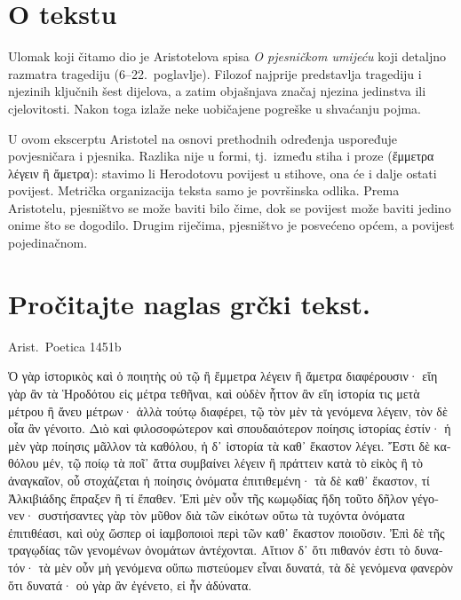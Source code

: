 


\section*{O tekstu}

Ulomak koji čitamo dio je Aristotelova spisa \textit{O pjesničkom umijeću} koji detaljno razmatra tragediju (6–22.\ poglavlje). Filozof najprije predstavlja tragediju i njezinih ključnih šest dijelova, a zatim objašnjava značaj njezina jedinstva ili cjelovitosti. Nakon toga izlaže neke uobičajene pogreške u shvaćanju pojma.
 
U ovom ekscerptu Aristotel na osnovi prethodnih određenja uspoređuje povjesničara i pjesnika. Razlika nije u formi, tj.\ između stiha i proze \textgreek[variant=ancient]{(ἔμμετρα λέγειν ἢ ἄμετρα):} stavimo li Herodotovu povijest u stihove, ona će i dalje ostati povijest. Metrička organizacija teksta samo je površinska odlika. Prema Aristotelu, pjesništvo se može baviti bilo čime, dok se povijest može baviti jedino onime što se dogodilo. Drugim riječima, pjesništvo je posvećeno općem, a povijest pojedinačnom.


\section*{Pročitajte naglas grčki tekst.}

Arist.\ Poetica 1451b


\medskip


{\large

\begin{greek}

\noindent  Ὁ γὰρ ἱστορικὸς καὶ ὁ ποιητὴς οὐ τῷ ἢ ἔμμετρα λέγειν ἢ ἄμετρα διαφέρουσιν· εἴη γὰρ ἂν τὰ Ἡροδότου εἰς μέτρα τεθῆναι, καὶ οὐδὲν ἧττον ἂν εἴη ἱστορία τις μετὰ μέτρου ἢ ἄνευ μέτρων· ἀλλὰ τούτῳ διαφέρει, τῷ τὸν μὲν τὰ γενόμενα λέγειν, τὸν δὲ οἷα ἂν γένοιτο.  Διὸ καὶ φιλοσοφώτερον καὶ σπουδαιότερον ποίησις ἱστορίας ἐστίν· ἡ μὲν γὰρ ποίησις μᾶλλον τὰ καθόλου, ἡ δ᾿ ἱστορία τὰ καθ᾿ ἕκαστον λέγει. Ἔστι δὲ καθόλου μέν, τῷ ποίῳ τὰ ποῖ᾿ ἄττα συμβαίνει λέγειν ἢ πράττειν κατὰ τὸ εἰκὸς ἢ τὸ ἀναγκαῖον, οὗ στοχάζεται ἡ ποίησις ὀνόματα ἐπιτιθεμένη· τὰ δὲ καθ᾿ ἕκαστον, τί Ἀλκιβιάδης ἔπραξεν ἢ τί ἔπαθεν. Ἐπὶ μὲν οὖν τῆς κωμῳδίας ἤδη τοῦτο δῆλον γέγονεν· συστήσαντες γὰρ τὸν μῦθον διὰ τῶν εἰκότων οὕτω τὰ τυχόντα ὀνόματα ἐπιτιθέασι, καὶ οὐχ ὥσπερ οἱ ἰαμβοποιοὶ περὶ τῶν καθ᾿ ἕκαστον ποιοῦσιν. Ἐπὶ δὲ τῆς τραγῳδίας τῶν γενομένων ὀνομάτων ἀντέχονται. Αἴτιον δ᾿ ὅτι πιθανόν ἐστι τὸ δυνατόν· τὰ μὲν οὖν μὴ γενόμενα οὔπω πιστεύομεν εἶναι δυνατά, τὰ δὲ γενόμενα φανερὸν ὅτι δυνατά· οὐ γὰρ ἂν ἐγένετο, εἰ ἦν ἀδύνατα.

\end{greek}

}



